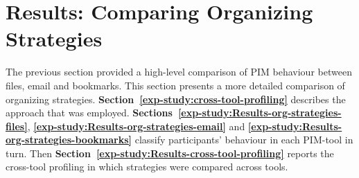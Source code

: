
\newpage
\section{Results: Comparing Organizing Strategies}
\label{exp-study:Results-org-strategies}

The previous section provided a high-level comparison of PIM behaviour between files, email and bookmarks.  This section presents a more detailed comparison of organizing strategies.  \textbf{Section~\ref{exp-study:cross-tool-profiling}} describes the approach that was employed.
\textbf{Sections~\ref{exp-study:Results-org-strategies-files}}, \textbf{\ref{exp-study:Results-org-strategies-email}} and \textbf{\ref{exp-study:Results-org-strategies-bookmarks}} classify participants' behaviour in each PIM-tool in turn.  Then \textbf{Section~\ref{exp-study:Results-cross-tool-profiling}} reports the cross-tool profiling in which strategies were compared across tools.



